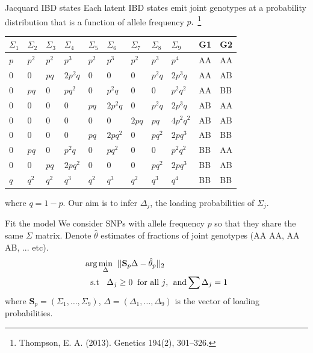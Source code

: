 \documentclass[]{beamer}
\def\S{{\mathbf{S}}}
\begin{document}
\begin{frame}{Jacquard IBD states} 
Each latent IBD states emit joint genotypes at a probability distribution that is a function of allele frequency $p.$~\footnote{Thompson, E. A. (2013).  Genetics 194(2), 301–326.}
\begin{center} 
\begin{tabular}{lllllllll|ll}
 $\Sigma_1$ &  $\Sigma_2$ &  $\Sigma_3$ &  $\Sigma_4$ &  $\Sigma_5$ &  $\Sigma_6$ &  $\Sigma_7$ &  $\Sigma_8$ &  $\Sigma_9$ &G1 & G2 \\
\hline 
 $p$ & $p^2$ & $p^2$ & $p^3$ & $p^2$ & $p^3$ & $p^2$ & $p^3$ & $p^4$ & AA &AA \\       
 $0$ & $0$ & $pq$ & $2p^2q$ & $0$ & $0$ & $0$ & $p^2q$ &$2p^3q$ &AA &AB  \\
 $0$ & $pq$ & $0$ & $pq^2$ & $0$ & $p^2q$ & $0$ & $0$ &$p^2q^2$ &AA &BB \\
 $0$ & $0$ & $0$ & $0$ & $pq$ & $2p^2q$ & $0$ & $p^2q$ &$2p^3q$ & AB &AA   \\
$0$ & $0$ & $0$ & $0$ & $0$ & $0$ & $2pq$ & $pq$ &$4p^2q^2$ & AB &AB   \\
 $0$ & $0$ & $0$ & $0$ & $pq$ & $2pq^2$ & $0$ & $pq^2$ &$2pq^3$ & AB &BB \\
$0$ & $pq$ & $0$ & $p^2q$ & $0$ & $pq^2$ & $0$ & $0$ &$p^2q^2$ & BB &AA   \\
 $0$ & $0$ & $pq$ & $2pq^2$ & $0$ & $0$ & $0$ & $pq^2$ &$2pq^3$ &BB &AB   \\
 $q$ & $q^2$ & $q^2$ & $q^3$ & $q^2$ & $q^3$ & $q^2$ & $q^3$ & $q^4$ &BB &BB \\       
  \end{tabular} 
  \end{center}
  where $q = 1-p.$ Our aim is to infer $\Delta_j$, the loading probabilities of $\Sigma_j$. 
\end{frame}


\begin{frame}{Fit the model}
We consider SNPs with allele frequency $p$ so that they share the same $\Sigma$ matrix.  Denote $\hat\theta$ estimates of fractions of joint genotypes (AA AA, AA AB, ... etc).   
\begin{subequations} \label{lse}
\begin{align}
{\text{arg} \min_\Delta\;\;}  &||\S_p \Delta - \hat\theta_p ||_2  \label{eq:lse} \\
       \mbox{s.t \;\;} \Delta_j & \ge 0  \mbox{\;\;for all $j$, \;and} \sum \Delta_j  = 1 \label{eq:st}
\end{align}
\end{subequations}
where $\S_p = (\Sigma_1, \dots, \Sigma_9)$, $\Delta=(\Delta_1, \dots, \Delta_9)$ is the vector of loading probabilities. 

\end{frame}
\end{document}
